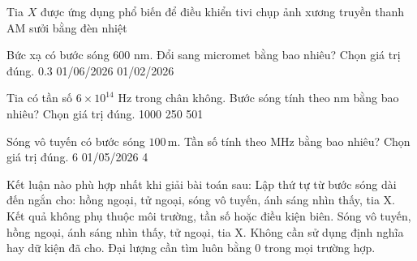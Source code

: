 \begin{ex}
Tia $X$ được ứng dụng phổ biến để
\choice
{điều khiển tivi}
{\True chụp ảnh xương}
{truyền thanh AM}
{sưởi bằng đèn nhiệt}
\end{ex}

\begin{ex}
Bức xạ có bước sóng 600 nm. Đổi sang micromet bằng bao nhiêu? Chọn giá trị đúng.
\choice
{0.3}
{01/06/2026}
{}
{01/02/2026}
\end{ex}

\begin{ex}
Tia có tần số $6\times10^{14}$ Hz trong chân không. Bước sóng tính theo nm bằng bao nhiêu? Chọn giá trị đúng.
\choice
{1000}
{250}
{501}
{}
\end{ex}

\begin{ex}
Sóng vô tuyến có bước sóng $100\,\text{m}$. Tần số tính theo MHz bằng bao nhiêu? Chọn giá trị đúng.
\choice
{}
{6}
{01/05/2026}
{4}
\end{ex}

\begin{ex}
Kết luận nào phù hợp nhất khi giải bài toán sau: Lập thứ tự từ bước sóng dài đến ngắn cho: hồng ngoại, tử ngoại, sóng vô tuyến, ánh sáng nhìn thấy, tia X.
\choice
{Kết quả không phụ thuộc môi trường, tần số hoặc điều kiện biên.}
{\True Sóng vô tuyến, hồng ngoại, ánh sáng nhìn thấy, tử ngoại, tia X.}
{Không cần sử dụng định nghĩa hay dữ kiện đã cho.}
{Đại lượng cần tìm luôn bằng 0 trong mọi trường hợp.}
\end{ex}

